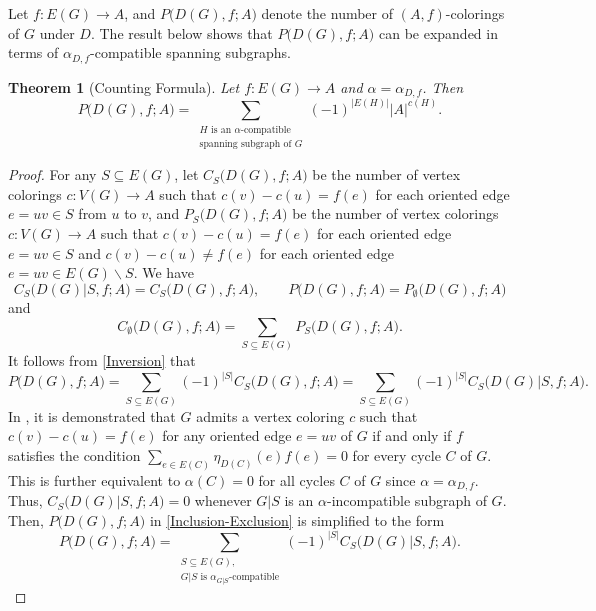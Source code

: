 \documentclass[12pt]{article}%
\numberwithin{equation}{section}
\newtheorem{theorem}{Theorem}[section]
\begin{document}
Let $f:E(G)\to A$, and $P\big(D(G),f;A\big)$ denote the number of $(A,f)$-colorings of $G$ under $D$. The result below shows that $P\big(D(G),f;A\big)$ can be expanded in terms of  $\alpha_{D,f}$-compatible spanning subgraphs. 
\begin{theorem}[Counting Formula]\label{Counting-Formula}
Let $ f: E(G)\to A$ and $\alpha=\alpha_{D,f}$. Then
\[
P\big(D(G),f;A\big)=\sum_{\substack{\mbox{$H$ is an $\alpha$-compatible}\\ \mbox{spanning subgraph of $G$}}} (-1)^{|E(H)|}|A|^{c(H)}.
\]
\end{theorem}
\begin{proof}
For any $S\subseteq E(G)$, let $C_S\big(D(G),f;A\big)$ be the number of  vertex colorings $c:V(G)\to A$ such that $c(v)-c(u)=f(e)$ for each oriented edge $e=uv\in S$ from $u$ to $v$, and $P_S\big(D(G),f;A\big)$ be the number of vertex colorings $c:V(G)\to A$ such that $c(v)-c(u)=f(e)$ for each oriented edge $e=uv\in S$ and $c(v)-c(u)\ne f(e)$ for each oriented edge $e=uv\in E(G)\smallsetminus S$. We have
\[
C_S\big(D(G)|S,f;A\big)=C_S\big(D(G),f;A\big),\quad\quad P\big(D(G),f;A\big)=P_{\emptyset}\big(D(G),f;A\big)
\]
and 
\[
C_{\emptyset}\big(D(G),f;A\big)=\sum_{S\subseteq E(G)}P_S\big(D(G),f;A\big).
\]
It follows from \eqref{Inversion} that
\begin{equation}\label{Inclusion-Exclusion}
P\big(D(G),f;A\big)=\sum_{S\subseteq E(G)}(-1)^{|S|}C_S\big(D(G),f;A\big)=\sum_{S\subseteq E(G)}(-1)^{|S|}C_S\big(D(G)|S,f;A\big).
\end{equation}
In \cite[Proposition 2.2]{Kochol2002}, it is demonstrated that $G$ admits a vertex coloring $c$ such that $c(v)-c(u)=f(e)$ for any oriented edge $e=uv$ of $G$ if and only if $f$ satisfies the condition $\sum_{e\in E(C)}\eta_{D(C)}(e)f(e)=0$ for every cycle $C$ of $G$. This is further equivalent to $\alpha(C)=0$ for all cycles $C$ of $G$ since $\alpha=\alpha_{D,f}$. Thus, $C_S\big(D(G)|S,f;A\big)=0$ whenever $G|S$ is an $\alpha$-incompatible subgraph of $G$. Then, $P\big(D(G),f;A\big)$ in \eqref{Inclusion-Exclusion} is simplified to the form
\begin{equation}\label{Eq1}
P\big(D(G),f;A\big)=\sum_{\substack{S\subseteq E(G),\\G|S\mbox{ is $\alpha_{G|S}$-compatible}}}(-1)^{|S|}C_S\big(D(G)|S,f;A\big).
\end{equation}


\end{proof}
\end{document}
